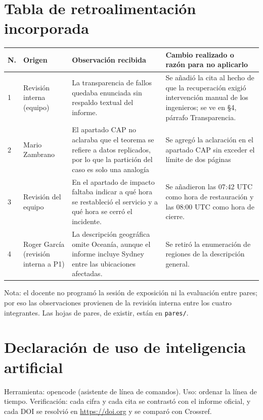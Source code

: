\documentclass[10pt,a4paper]{article}
\begin{document}
\section*{Tabla de retroalimentación incorporada}
\begin{center}
\small
\begin{tabularx}{\linewidth}{@{}p{0.6cm}p{2.2cm}XX@{}}
\toprule
N. & Origen & Observación recibida & Cambio realizado o razón para no aplicarlo \\
\midrule
1 & Revisión interna (equipo) & La transparencia de fallos quedaba enunciada sin respaldo textual del informe. & Se añadió la cita al hecho de que la recuperación exigió intervención manual de los ingenieros; se ve en §4, párrafo Transparencia. \\
2 & Mario Zambrano & El apartado CAP no aclaraba que el teorema se refiere a datos replicados, por lo que la partición del caso es solo una analogía & Se agregó la aclaración en el apartado CAP sin exceder el límite de dos páginas \\
3 & Revisión del equipo  & En el apartado de impacto faltaba indicar a qué hora se restableció el servicio y a qué hora se cerró el incidente. & Se añadieron las 07:42 UTC como hora de restauración y las 08:00 UTC como hora de cierre. \\
4 & Roger García (revisión interna a P1)
& La descripción geográfica omite Oceanía, aunque el informe
incluye Sydney entre las ubicaciones afectadas.
& Se retiró la enumeración de regiones de la descripción general. \\\bottomrule
\end{tabularx}
\end{center}

{\footnotesize Nota: el docente no programó la sesión de exposición ni la evaluación entre pares; por eso las observaciones provienen de la revisión interna entre los cuatro integrantes. Las hojas de pares, de existir, están en \texttt{pares/}.}

\section*{Declaración de uso de inteligencia artificial}
Herramienta: opencode (asistente de línea de comandos). Uso: ordenar la línea de tiempo. Verificación: cada cifra y cada cita se contrastó con el informe oficial, y cada DOI se resolvió en \url{https://doi.org} y se comparó con Crossref.


\printbibliography
\end{document}
